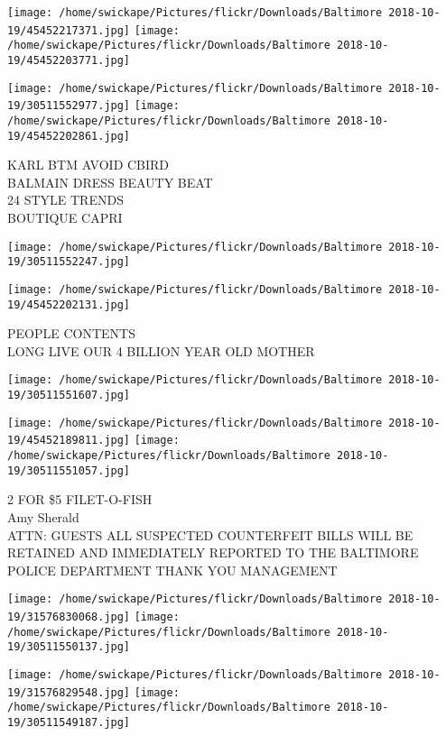 \documentclass[10pt,letterpaper]{article}
\begin{document}
\texttt{[image: /home/swickape/Pictures/flickr/Downloads/Baltimore 2018-10-19/45452217371.jpg]}
\texttt{[image: /home/swickape/Pictures/flickr/Downloads/Baltimore 2018-10-19/45452203771.jpg]}

\texttt{[image: /home/swickape/Pictures/flickr/Downloads/Baltimore 2018-10-19/30511552977.jpg]}
\texttt{[image: /home/swickape/Pictures/flickr/Downloads/Baltimore 2018-10-19/45452202861.jpg]}

KARL BTM AVOID CBIRD\\
BALMAIN DRESS BEAUTY BEAT\\
24 STYLE TRENDS\\
BOUTIQUE CAPRI
\pagebreak

\texttt{[image: /home/swickape/Pictures/flickr/Downloads/Baltimore 2018-10-19/30511552247.jpg]}

\vspace{0.25in}
\texttt{[image: /home/swickape/Pictures/flickr/Downloads/Baltimore 2018-10-19/45452202131.jpg]}

PEOPLE CONTENTS\\
LONG LIVE OUR 4 BILLION YEAR OLD MOTHER
\pagebreak

\texttt{[image: /home/swickape/Pictures/flickr/Downloads/Baltimore 2018-10-19/30511551607.jpg]}

\vspace{0.25in}
\texttt{[image: /home/swickape/Pictures/flickr/Downloads/Baltimore 2018-10-19/45452189811.jpg]}
\texttt{[image: /home/swickape/Pictures/flickr/Downloads/Baltimore 2018-10-19/30511551057.jpg]}

2 FOR \$5 FILET{-}O{-}FISH\\
Amy Sherald\\
ATTN: GUESTS ALL SUSPECTED COUNTERFEIT BILLS WILL BE RETAINED AND IMMEDIATELY REPORTED TO THE BALTIMORE POLICE DEPARTMENT THANK YOU MANAGEMENT
\pagebreak

\texttt{[image: /home/swickape/Pictures/flickr/Downloads/Baltimore 2018-10-19/31576830068.jpg]}
\texttt{[image: /home/swickape/Pictures/flickr/Downloads/Baltimore 2018-10-19/30511550137.jpg]}

\texttt{[image: /home/swickape/Pictures/flickr/Downloads/Baltimore 2018-10-19/31576829548.jpg]}
\texttt{[image: /home/swickape/Pictures/flickr/Downloads/Baltimore 2018-10-19/30511549187.jpg]}
\end{document}
